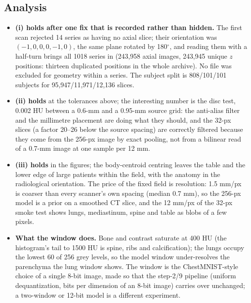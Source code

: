 \documentclass[11pt]{article}
\begin{document}
\subsection{Analysis}
\label{sec:step12analysis}
\begin{itemize}
  \item \textbf{(i) holds after one fix that is recorded rather than
        hidden.} The first scan rejected 14 series as having no axial slice;
        their orientation was $(-1,0,0,0,-1,0)$, the same plane rotated by
        180$^\circ$, and reading them with a half-turn brings all 1018
        series in (243,958 axial images, 243,945 unique $z$ positions:
        thirteen duplicated positions in the whole archive). No file was
        excluded for geometry within a series. The subject split is
        808/101/101 subjects for 95,947/11,971/12,136 slices.
  \item \textbf{(ii) holds} at the tolerances above; the interesting number
        is the disc test, 0.002 HU between a 0.6-mm and a 0.95-mm source
        grid: the anti-alias filter and the millimetre placement are doing
        what they should, and the 32-px slices (a factor 20--26 below the
        source spacing) are correctly filtered because they come from the
        256-px image by exact pooling, not from a bilinear read of a
        0.7-mm image at one sample per 12 mm.
  \item \textbf{(iii) holds} in the figures; the body-centroid centring
        leaves the table and the lower edge of large patients within the
        field, with the anatomy in the radiological orientation. The
        price of the fixed field is resolution: 1.5 mm/px is coarser than
        every scanner's own spacing (median 0.7 mm), so the 256-px model is
        a prior on a smoothed CT slice, and the 12 mm/px of the 32-px smoke
        test shows lungs, mediastinum, spine and table as blobs of a few
        pixels.
  \item \textbf{What the window does.} Bone and contrast saturate at 400 HU
        (the histogram's tail to 1500 HU is spine, ribs and calcification);
        the lungs occupy the lowest 60 of 256 grey levels, so the model
        window under-resolves the parenchyma the lung window shows. The
        window is the ChestMNIST-style choice of a single 8-bit image, made
        so that the step-2/9 pipeline (uniform dequantization, bits per
        dimension of an 8-bit image) carries over unchanged; a
        two-window or 12-bit model is a different experiment.
\end{itemize}
\end{document}
